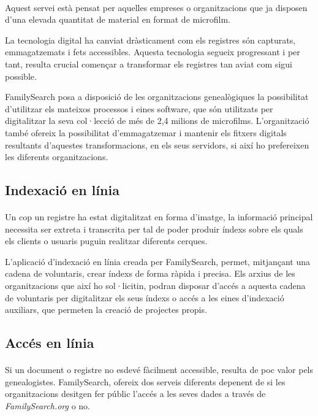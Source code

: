     \paragraph{}
    Aquest servei està pensat per aquelles empreses o organitzacions que ja disposen d’una elevada quantitat de material en format de microfilm.

    La tecnologia digital ha canviat dràsticament com els registres són capturats, emmagatzemats i fets accessibles. Aquesta tecnologia segueix progressant i per tant, resulta crucial començar a transformar els registres tan aviat com sigui possible.

    FamilySearch posa a disposició de les organitzacions genealògiques la possibilitat d’utilitzar els mateixos processos i eines software, que són utilitzats per digitalitzar la seva col·lecció de més de 2,4 milions de microfilms. L'organització també ofereix la possibilitat d’emmagatzemar i mantenir els fitxers digitals resultants d'aquestes transformacions, en els seus servidors, si així ho prefereixen les diferents organitzacions.


    \subsection{Indexació en línia}

    \paragraph{}
    Un cop un registre ha estat digitalitzat en forma d’imatge, la informació principal necessita ser extreta i transcrita per tal de poder produir índexs sobre els quals els clients o usuaris puguin realitzar diferents cerques.

    L’aplicació d’indexació en línia creada per FamilySearch, permet, mitjançant una cadena de voluntaris, crear índexs de forma ràpida i precisa. Els arxius de les organitzacions que així ho sol·licitin, podran disposar d’accés a aquesta cadena de voluntaris per digitalitzar els seus índexs o accés a les eines d’indexació auxiliars, que permeten la creació de projectes propis.


    \subsection{Accés en línia}

    \paragraph{}
    Si un document o registre no esdevé fàcilment accessible, resulta de poc valor pels genealogistes. FamilySearch, ofereix dos serveis diferents depenent de si les or\-ga\-nit\-za\-cions desitgen fer públic l'accés a les seves dades a través de \emph{FamilySearch.org} o no.

